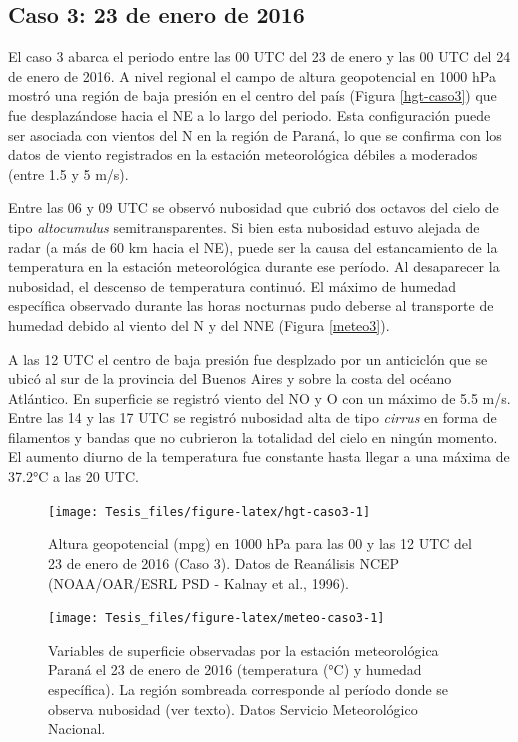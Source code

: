 \documentclass[12pt,spanish,oneside, a4paper]{book}
\begin{document}
\subsection{Caso 3: 23 de enero de
2016}\label{caso-3-23-de-enero-de-2016}

El caso 3 abarca el periodo entre las 00 UTC del 23 de enero y las 00
UTC del 24 de enero de 2016. A nivel regional el campo de altura
geopotencial en 1000 hPa mostró una región de baja presión en el centro
del país (Figura \ref{hgt-caso3}) que fue desplazándose hacia el NE a lo
largo del periodo. Esta configuración puede ser asociada con vientos del
N en la región de Paraná, lo que se confirma con los datos de viento
registrados en la estación meteorológica débiles a moderados (entre 1.5
y 5 m/s).

Entre las 06 y 09 UTC se observó nubosidad que cubrió dos octavos del
cielo de tipo \emph{altocumulus} semitransparentes. Si bien esta
nubosidad estuvo alejada de radar (a más de 60 km hacia el NE), puede
ser la causa del estancamiento de la temperatura en la estación
meteorológica durante ese período. Al desaparecer la nubosidad, el
descenso de temperatura continuó. El máximo de humedad específica
observado durante las horas nocturnas pudo deberse al transporte de
humedad debido al viento del N y del NNE (Figura \ref{meteo3}).

A las 12 UTC el centro de baja presión fue desplzado por un anticiclón
que se ubicó al sur de la provincia del Buenos Aires y sobre la costa
del océano Atlántico. En superficie se registró viento del NO y O con un
máximo de 5.5 m/s. Entre las 14 y las 17 UTC se registró nubosidad alta
de tipo \emph{cirrus} en forma de filamentos y bandas que no cubrieron
la totalidad del cielo en ningún momento. El aumento diurno de la
temperatura fue constante hasta llegar a una máxima de 37.2°C a las 20
UTC.

\begin{figure}

{\centering \texttt{[image: Tesis\_files/figure-latex/hgt-caso3-1]} 

}

\caption{Altura geopotencial (mpg) en 1000 hPa para las 00 y las 12 UTC del 23 de enero de 2016 (Caso 3). Datos de Reanálisis NCEP (NOAA/OAR/ESRL PSD - Kalnay et al., 1996). \label{hgt-caso3}}\label{fig:hgt-caso3}
\end{figure}

\begin{figure}

{\centering \texttt{[image: Tesis\_files/figure-latex/meteo-caso3-1]} 

}

\caption{Variables de superficie observadas por la estación meteorológica Paraná el 23 de enero de 2016 (temperatura (°C) y humedad específica). La región sombreada corresponde al período donde se observa nubosidad (ver texto). Datos Servicio Meteorológico Nacional. \label{meteo3}}\label{fig:meteo-caso3}
\end{figure}
\end{document}

